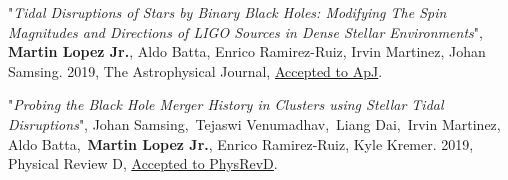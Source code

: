 \begin{cventries}
	
	\publicationentry
	{"\textit{Tidal Disruptions of Stars by Binary Black Holes: Modifying The Spin Magnitudes and Directions of LIGO Sources in Dense Stellar Environments}", \textbf{Martin Lopez Jr.}, Aldo Batta, Enrico Ramirez-Ruiz, Irvin Martinez, Johan Samsing. 2019, The Astrophysical Journal, \href{https://ui.adsabs.harvard.edu/abs/2019ApJ...877...56L/abstract}{\underline{Accepted to ApJ}}.}
	{}    
	{}
	{}
	{
	}

	\vspace{-0.5cm}
	
	\publicationentry
	{"\textit{Probing the Black Hole Merger History in Clusters using Stellar Tidal Disruptions}", Johan Samsing, Tejaswi Venumadhav, Liang Dai, Irvin Martinez, Aldo Batta, \textbf{Martin Lopez Jr.}, Enrico Ramirez-Ruiz, Kyle Kremer. 2019, Physical Review D, \href{https://ui.adsabs.harvard.edu/abs/2019PhRvD.100d3009S/abstract}{\underline{Accepted to PhysRevD}}.}
	{}
	{}
	{}
	{
	}
	
	\vspace{-0.2cm}
\end{cventries}